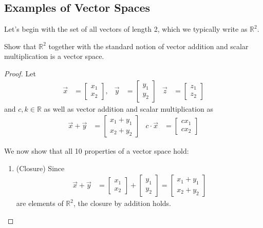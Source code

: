 \subsection{Examples of Vector Spaces}

Let's begin with the set of all vectors of length 2, which we typically write as $\mathbb{R}^2$.  

\begin{lemma} 
Show that $\mathbb{R}^2$ together with the standard notion of vector addition and scalar multiplication is a vector space. 
\end{lemma}

\begin{proof}
 Let 
\begin{align*}
 \vec{x} & = 
\begin{bmatrix}
 x_1 \\ x_2
\end{bmatrix}, & 
\vec{y} & = 
\begin{bmatrix}
 y_1 \\ y_2 
\end{bmatrix} & 
\vec{z} & = \begin{bmatrix}
z_1 \\ z_2 
\end{bmatrix}
\end{align*}
and $c,k \in \mathbb{R}$ as well as vector addition and scalar multiplication as 
% 
\begin{align*}
 \vec{x} + \vec{y} & = 
\begin{bmatrix}
 x_1 + y_1 \\ x_2 + y_2 
\end{bmatrix} & 
 c \cdot \vec{x} & = 
\begin{bmatrix}
 c x_1 \\ c x_2 
\end{bmatrix}
\end{align*}

We now show that all 10 properties of a vector space hold:
% 
\begin{enumerate}
\item (Closure) Since
%
\begin{align*}
\vec{x} + \vec{y} & = \begin{bmatrix}
x_1 \\ x_2 
\end{bmatrix} + \begin{bmatrix}
y_1 \\ y_2 
\end{bmatrix} = \begin{bmatrix}
x_1 + y_1 \\ x_2 + y_2 
\end{bmatrix}
\end{align*}
are elements of $\mathbb{R}^2$, the closure by addition holds.  


\end{enumerate}
\end{proof}
